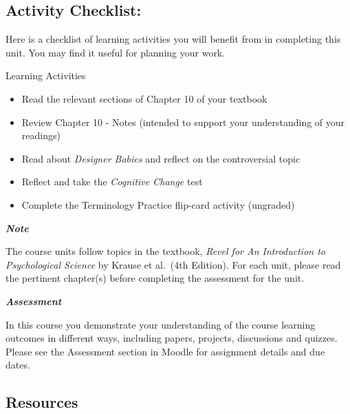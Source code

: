 \documentclass[
]{book}
\providecommand{\tightlist}{%
  \setlength{\itemsep}{0pt}\setlength{\parskip}{0pt}}
\begin{document}
\hypertarget{activity-checklist-2}{%
\subsection*{Activity Checklist:}\label{activity-checklist-2}}

Here is a checklist of learning activities you will benefit from in completing this unit. You may find it useful for planning your work.

\begin{reflect}
{Learning Activities}

\begin{itemize}
\tightlist
\item
  Read the relevant sections of Chapter 10 of your textbook
\item
  Review Chapter 10 - Notes (intended to support your understanding of your readings)
\item
  Read about \emph{Designer Babies} and reflect on the controversial topic
\item
  Reflect and take the \emph{Cognitive Change} test
\item
  Complete the Terminology Practice flip-card activity (ungraded)
\end{itemize}
\end{reflect}

\begin{caution}
\textbf{\emph{Note}}

The course units follow topics in the textbook, \emph{Revel for An Introduction to Psychological Science} by Krause et al.~(4th Edition). For each unit, please read the pertinent chapter(s) before completing the assessment for the unit.
\end{caution}

\begin{assessment}
\textbf{\emph{Assessment}}

In this course you demonstrate your understanding of the course learning outcomes in different ways, including papers, projects, discussions and quizzes. Please see the Assessment section in Moodle for assignment details and due dates.
\end{assessment}

\hypertarget{resources-2}{%
\subsection*{Resources}\label{resources-2}}
\end{document}
